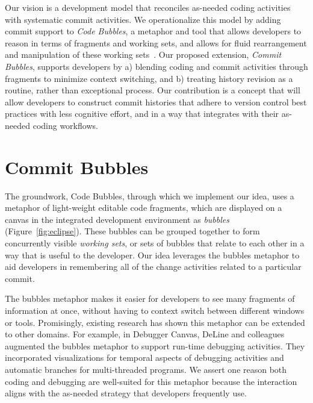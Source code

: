 \documentclass[conference]{IEEEtran}
\newcommand{\purpose}[1]{}
\begin{document}
\purpose{we envision a tool that treats history revision as routine and integrates it with coding} 
Our vision is a development model that reconciles as-needed coding activities with systematic commit activities.
We operationalize this model by adding commit support to \emph{Code Bubbles}, a metaphor and tool that allows developers
to reason in terms of fragments and working sets, and allows for fluid rearrangement and manipulation of these working sets~\cite{Bragdon2010a}.
Our proposed extension, \emph{Commit Bubbles}, supports developers by a) blending coding and commit activities through fragments to  
minimize context switching, and b) treating history revision as a routine, rather than exceptional process. 
Our contribution is a concept that will allow developers to construct commit histories that adhere to version control best practices with less cognitive effort, and in a way that integrates with their as-needed coding workflows.





\section{Commit Bubbles}


The groundwork, Code Bubbles, through which we implement our idea, uses a metaphor of light-weight editable code fragments, which are displayed on a canvas in the integrated development environment as \emph{bubbles} (Figure~\ref{fig:eclipse}). 
These bubbles can be grouped together to form concurrently visible \emph{working sets}, or sets of bubbles that relate to each other in a way that is useful to the developer. Our idea leverages the bubbles metaphor to aid developers in remembering all of the change activities related to a particular commit.


The bubbles metaphor makes it easier for developers to see many fragments of information at once, without having to context switch between different windows or tools. 
Promisingly, existing research has shown this metaphor can be extended to other domains. 
For example, in Debugger Canvas, DeLine and colleagues~\cite{DeLine2012} augmented the bubbles metaphor to support run-time debugging activities.
They incorporated visualizations for temporal aspects of debugging activities and automatic branches for multi-threaded programs. 
We assert one reason both coding and debugging are well-suited for this metaphor because the interaction aligns with the as-needed strategy that developers frequently use.
\end{document}
